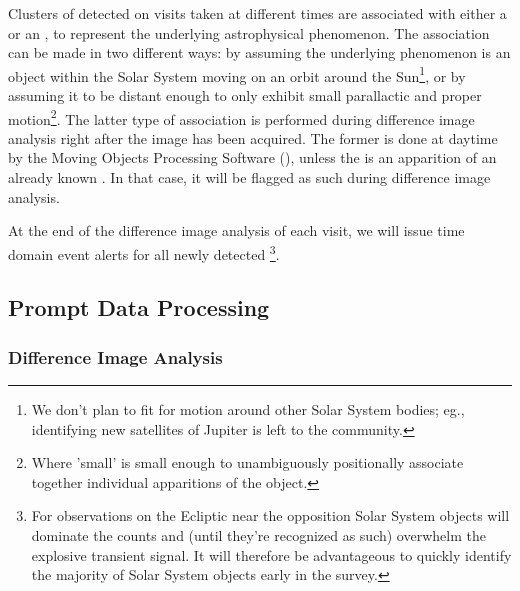 \documentclass[SE,lsstdraft,toc]{lsstdoc}
\begin{document}
Clusters of \DIASources detected on visits taken at different times are associated with either a \DIAObject or an \SSObject, to represent the underlying astrophysical phenomenon. The association can be made in two different ways: by assuming the underlying phenomenon is an object within the Solar System moving on an orbit around the Sun\footnote{We don't plan to fit for motion around other Solar System bodies; eg., identifying new satellites of Jupiter is left to the community.}, or by assuming it to be distant enough to only exhibit small parallactic and proper motion\footnote{Where 'small' is small enough to unambiguously positionally associate together individual apparitions of the object.}. The latter type of association is performed during difference image analysis right after the image has been acquired. The former is done at daytime by the Moving Objects Processing Software (), unless the \DIASource is an apparition of an already known \SSObject. In that case, it will be flagged as such during difference image analysis.

At the end of the difference image analysis of each visit, we will issue time domain event alerts for all newly %
detected \DIASources\footnote{For observations on the Ecliptic near the opposition Solar System objects will dominate the \DIASource counts and (until they're recognized as such) overwhelm the explosive transient signal. It will therefore be advantageous to quickly identify the majority of Solar System objects early in the survey.}.

\subsection{Prompt Data Processing}

\subsubsection{Difference Image Analysis}
\label{sec:dia}
\end{document}
